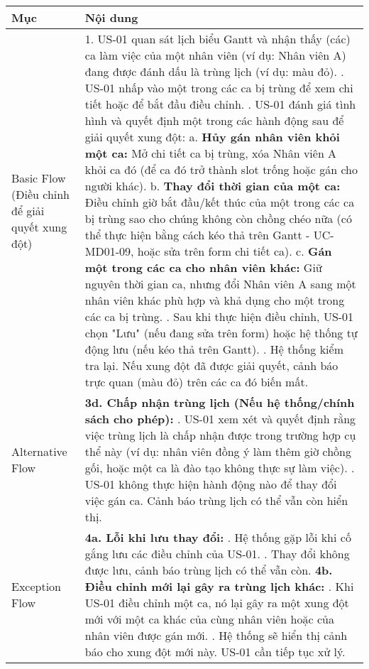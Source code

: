 \begin{longtable}{|m{4cm}|p{11cm}|}
\hline
\textbf{Mục} & \textbf{Nội dung} \\
\hline
Basic Flow (Điều chỉnh để giải quyết xung đột) & 1. US-01 quan sát lịch biểu Gantt và nhận thấy (các) ca làm việc của một nhân viên (ví dụ: Nhân viên A) đang được đánh dấu là trùng lịch (ví dụ: màu đỏ). \newline 2. US-01 nhấp vào một trong các ca bị trùng để xem chi tiết hoặc để bắt đầu điều chỉnh. \newline 3. US-01 đánh giá tình hình và quyết định một trong các hành động sau để giải quyết xung đột: \newline    a. \textbf{Hủy gán nhân viên khỏi một ca:} Mở chi tiết ca bị trùng, xóa Nhân viên A khỏi ca đó (để ca đó trở thành slot trống hoặc gán cho người khác). \newline    b. \textbf{Thay đổi thời gian của một ca:} Điều chỉnh giờ bắt đầu/kết thúc của một trong các ca bị trùng sao cho chúng không còn chồng chéo nữa (có thể thực hiện bằng cách kéo thả trên Gantt - UC-MD01-09, hoặc sửa trên form chi tiết ca). \newline    c. \textbf{Gán một trong các ca cho nhân viên khác:} Giữ nguyên thời gian ca, nhưng đổi Nhân viên A sang một nhân viên khác phù hợp và khả dụng cho một trong các ca bị trùng. \newline 4. Sau khi thực hiện điều chỉnh, US-01 chọn "Lưu" (nếu đang sửa trên form) hoặc hệ thống tự động lưu (nếu kéo thả trên Gantt). \newline 5. Hệ thống kiểm tra lại. Nếu xung đột đã được giải quyết, cảnh báo trực quan (màu đỏ) trên các ca đó biến mất. \\
\hline
Alternative Flow & \textbf{3d. Chấp nhận trùng lịch (Nếu hệ thống/chính sách cho phép):} \newline    1. US-01 xem xét và quyết định rằng việc trùng lịch là chấp nhận được trong trường hợp cụ thể này (ví dụ: nhân viên đồng ý làm thêm giờ chồng gối, hoặc một ca là đào tạo không thực sự làm việc). \newline    2. US-01 không thực hiện hành động nào để thay đổi việc gán ca. Cảnh báo trùng lịch có thể vẫn còn hiển thị. \\
\hline
Exception Flow & \textbf{4a. Lỗi khi lưu thay đổi:} \newline    1. Hệ thống gặp lỗi khi cố gắng lưu các điều chỉnh của US-01. \newline    2. Thay đổi không được lưu, cảnh báo trùng lịch có thể vẫn còn. \newline \textbf{4b. Điều chỉnh mới lại gây ra trùng lịch khác:} \newline    1. Khi US-01 điều chỉnh một ca, nó lại gây ra một xung đột mới với một ca khác của cùng nhân viên hoặc của nhân viên được gán mới. \newline    2. Hệ thống sẽ hiển thị cảnh báo cho xung đột mới này. US-01 cần tiếp tục xử lý. \\

\end{longtable}

